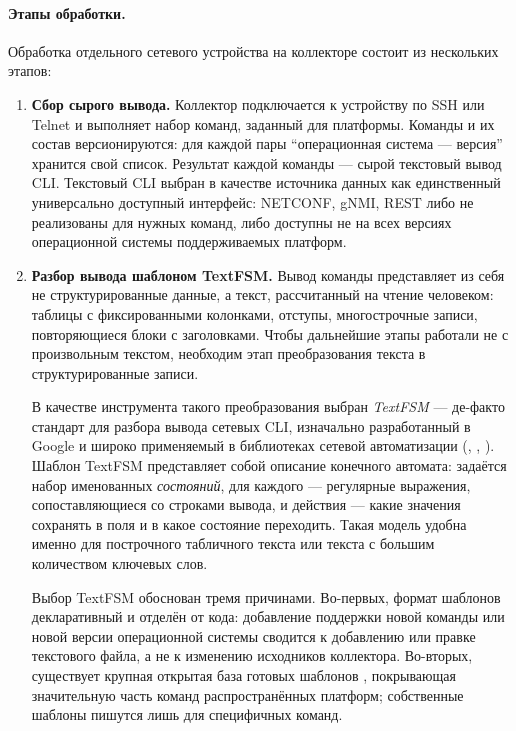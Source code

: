 \paragraph{Этапы обработки.} Обработка отдельного сетевого устройства на коллекторе состоит из нескольких этапов:
\begin{enumerate}
    \item \textbf{Сбор сырого вывода.} Коллектор подключается к устройству по SSH или Telnet и выполняет набор команд, заданный для платформы. Команды и их состав версионируются: для каждой пары ``операционная система --- версия'' хранится свой список. Результат каждой команды --- сырой текстовый вывод CLI. Текстовый CLI выбран в качестве источника данных как единственный универсально доступный интерфейс: NETCONF, gNMI, REST либо не реализованы для нужных команд, либо доступны не на всех версиях операционной системы поддерживаемых платформ.

    \item \textbf{Разбор вывода шаблоном TextFSM.} Вывод команды представляет из себя не структурированные данные, а текст, рассчитанный на чтение человеком: таблицы с фиксированными колонками, отступы, многострочные записи, повторяющиеся блоки с заголовками. Чтобы дальнейшие этапы работали не с произвольным текстом, необходим этап преобразования текста в структурированные записи.

    В качестве инструмента такого преобразования выбран \emph{TextFSM} --- де-факто стандарт для разбора вывода сетевых CLI, изначально разработанный в Google и широко применяемый в библиотеках сетевой автоматизации (, , ). Шаблон TextFSM представляет собой описание конечного автомата: задаётся набор именованных \emph{состояний}, для каждого --- регулярные выражения, сопоставляющиеся со строками вывода, и действия --- какие значения сохранять в поля и в какое состояние переходить. Такая модель удобна именно для построчного табличного текста или текста с большим количеством ключевых слов.

    Выбор TextFSM обоснован тремя причинами. Во-первых, формат шаблонов декларативный и отделён от кода: добавление поддержки новой команды или новой версии операционной системы сводится к добавлению или правке текстового файла, а не к изменению исходников коллектора. Во-вторых, существует крупная открытая база готовых шаблонов , покрывающая значительную часть команд распространённых платформ; собственные шаблоны пишутся лишь для специфичных команд.


\end{enumerate}

